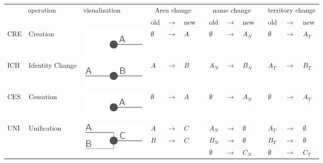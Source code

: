 \begin{table}[H]
\begin{center}
\begin{tabular}{m{0.65cm} m{2.5cm} m{2.2cm}
                m{0.35cm} m{0.3cm} m{0.35cm} m{0.01cm}
                m{0.35cm} m{0.3cm} m{0.35cm} m{0.01cm}
                m{0.35cm} m{0.3cm} m{0.88cm}}
  \toprule
    \multicolumn{2}{c}{operation}
  & visualization
  & \multicolumn{3}{c}{Area change} &
  & \multicolumn{3}{c}{name change} &
  & \multicolumn{3}{c}{territory change} \\
  & & &
  old & $ \rightarrow $ & new & &
  old & $ \rightarrow $ & new & &
  old & $ \rightarrow $ & new \\

  \midrule
  CRE & Creation & \includegraphics{graphics/concept/operations/CRE} &
  $ \emptyset $ & $ \rightarrow $ & $ A $ & &
  $ \emptyset $ & $ \rightarrow $ & $ A_N $ & &
  $ \emptyset $ & $ \rightarrow $ & $ A_T $ \\

  \midrule
  ICH & Identity Change & \includegraphics{graphics/concept/operations/ICH} &
  $ A   $ & $ \rightarrow $ & $ B $ & &
  $ A_N $ & $ \rightarrow $ & $ B_N $ & &
  $ A_T $ & $ \rightarrow $ & $ B_T $ \\

  \midrule
  CES & Cessation & \includegraphics{graphics/concept/operations/CRE} &
  $ \emptyset $ & $ \rightarrow $ & $ A $ & &
  $ \emptyset $ & $ \rightarrow $ & $ A_N $ & &
  $ \emptyset $ & $ \rightarrow $ & $ A_T $ \\

  \midrule
  \multirow{3}{*}{UNI} &
  \multirow{3}{*}{Unification} &
  \multirow{3}{*}{\includegraphics{graphics/concept/operations/UNI}} &
  $ A $ & $ \rightarrow $ & $ C $ & &
  $ A_N $ & $ \rightarrow $ & $ \emptyset $ & &
  $ A_T $ & $ \rightarrow $ & $ \emptyset $ \\
  & & &
  $ B $ & $ \rightarrow $ & $ C $ & &
  $ B_N $ & $ \rightarrow $ & $ \emptyset $ & &
  $ B_T $ & $ \rightarrow $ & $ \emptyset $ \\
  & & &
  & & & &
  $ \emptyset $ & $ \rightarrow $ & $ C_N $ & &
  $ \emptyset $ & $ \rightarrow $ & $ C_T $ \footnotemark \\


\end{tabular}
\end{center}
\end{table}
